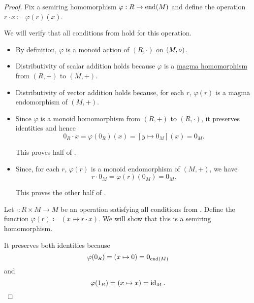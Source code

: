 \begin{proof}
   Fix a semiring homomorphism \( \varphi: R \to \operatorname{end}(M) \) and define the operation \( r \cdot x \coloneqq \varphi(r)(x) \).

  We will verify that all conditions from  hold for this operation.

  \begin{itemize}
    \item By definition, \( \varphi \) is a monoid action of \( (R, \cdot) \) on \( (M, \bincirc) \).

    \item Distributivity of scalar addition holds because \( \varphi \) is a \hyperref[def:magma/homomorphism]{magma homomorphism} from \( (R, +) \) to \( (M, +) \).

    \item Distributivity of vector addition holds because, for each \( r \), \( \varphi(r) \) is a magma endomorphism of \( (M, +) \).

    \item Since \( \varphi \) is a monoid homomorphism from \( (R,  +) \) to \( (R, \cdot) \), it preserves identities and hence
    \begin{equation*}
      0_R \cdot x = \varphi(0_R)(x) = [y \mapsto 0_M](x) = 0_M.
    \end{equation*}

    This proves half of .

    \item Since, for each \( r \), \( \varphi(r) \) is a monoid endomorphism of \( (M, +) \), we have
    \begin{equation*}
      r \cdot 0_M = \varphi(r)(0_M) = 0_M.
    \end{equation*}

    This proves the other half of .
  \end{itemize}

   Let \( \cdot: R \times M \to M \) be an operation satisfying all conditions from . Define the function \( \varphi(r) \coloneqq (x \mapsto r \cdot x) \). We will show that this is a semiring homomorphism.

  It preserves both identities because
  \begin{equation*}
    \varphi(0_R) = (x \mapsto 0) = 0_{\operatorname{end}(M)}
  \end{equation*}
  and
  \begin{equation*}
    \varphi(1_R) = (x \mapsto x) = \operatorname{id}_M.
  \end{equation*}


\end{proof}
